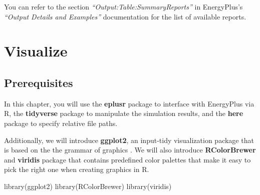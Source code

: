 \documentclass[
]{book}
\newenvironment{Shaded}{\begin{snugshade}}{\end{snugshade}}
\newcommand{\AttributeTok}[1]{\textcolor[rgb]{0.77,0.63,0.00}{#1}}
\newcommand{\ConstantTok}[1]{\textcolor[rgb]{0.00,0.00,0.00}{#1}}
\newcommand{\DecValTok}[1]{\textcolor[rgb]{0.00,0.00,0.81}{#1}}
\newcommand{\DocumentationTok}[1]{\textcolor[rgb]{0.56,0.35,0.01}{\textbf{\textit{#1}}}}
\newcommand{\FunctionTok}[1]{\textcolor[rgb]{0.00,0.00,0.00}{#1}}
\newcommand{\NormalTok}[1]{#1}
\newcommand{\OtherTok}[1]{\textcolor[rgb]{0.56,0.35,0.01}{#1}}
\newcommand{\SpecialCharTok}[1]{\textcolor[rgb]{0.00,0.00,0.00}{#1}}
\newcommand{\StringTok}[1]{\textcolor[rgb]{0.31,0.60,0.02}{#1}}
\begin{document}
\begin{Shaded}
\end{Shaded}

You can refer to the section \emph{``Output:Table:SummaryReports''} in EnergyPlus's \emph{``Output Details and Examples''} documentation for the list of available reports.

\hypertarget{visualize}{%
\chapter{Visualize}\label{visualize}}

\hypertarget{prerequisites-9}{%
\section{Prerequisites}\label{prerequisites-9}}

In this chapter, you will use the \textbf{eplusr} package to interface with EnergyPlus via R, the \textbf{tidyverse} package to manipulate the simulation results, and the \textbf{here} package to specify relative file paths.

Additionally, we will introduce \textbf{ggplot2}, an input-tidy visualization package that is based on the the grammar of graphics \citep{wilkinson_grammar_2012}. We will also introduce \textbf{RColorBrewer} and \textbf{viridis} package that contains predefined color palettes that make it easy to pick the right one when creating graphics in R.

\begin{Shaded}
\begin{Highlighting}[]
\FunctionTok{library}\NormalTok{(ggplot2)}
\FunctionTok{library}\NormalTok{(RColorBrewer)}
\FunctionTok{library}\NormalTok{(viridis)}
\end{Highlighting}
\end{Shaded}
\end{document}
